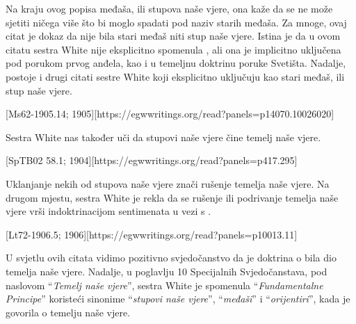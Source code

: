 Na kraju ovog popisa međaša, ili stupova naše vjere, ona kaže da se ne može sjetiti ničega više što bi moglo spadati pod naziv starih međaša. Za mnoge, ovaj citat je dokaz da  nije bila stari međaš niti stup naše vjere. Istina je da u ovom citatu sestra White nije eksplicitno spomenula , ali ona je implicitno uključena pod porukom prvog anđela, kao i u temeljnu doktrinu poruke Svetišta. Nadalje, postoje i drugi citati sestre White koji eksplicitno uključuju  kao stari međaš, ili stup naše vjere.

[Ms62-1905.14; 1905][https://egwwritings.org/read?panels=p14070.10026020]

Sestra White nas također uči da stupovi naše vjere čine temelj naše vjere.

[SpTB02 58.1; 1904][https://egwwritings.org/read?panels=p417.295]

Uklanjanje nekih od stupova naše vjere znači rušenje temelja naše vjere. Na drugom mjestu, sestra White je rekla da se rušenje ili podrivanje temelja naše vjere vrši indoktrinacijom sentimenata u vezi s .

[Lt72-1906.5; 1906][https://egwwritings.org/read?panels=p10013.11]

U svjetlu ovih citata vidimo pozitivno svjedočanstvo da je doktrina o  bila dio temelja naše vjere. Nadalje, u poglavlju 10 Specijalnih Svjedočanstava, pod naslovom “\textit{Temelj naše vjere}”, sestra White je spomenula “\textit{Fundamentalne Principe}” koristeći sinonime “\textit{stupovi naše vjere}”, “\textit{međaši}” i “\textit{orijentiri}”, kada je govorila o temelju naše vjere.

